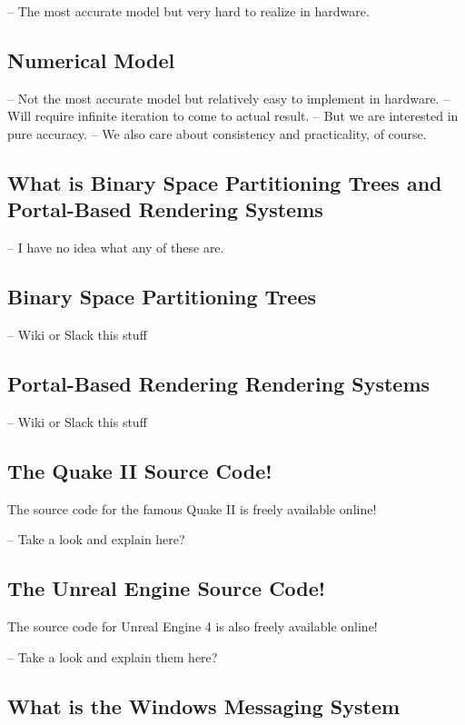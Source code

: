 \documentclass[a4paper,12pt]{book}
\begin{document}
-- The most accurate model but very hard to realize in hardware.

\subsection{Numerical Model}

-- Not the most accurate model but relatively easy to implement in hardware.
-- Will require infinite iteration to come to actual result.
-- But we are interested in pure accuracy.
-- We also care about consistency and practicality, of course.

\subsection{What is Binary Space Partitioning Trees and Portal-Based Rendering Systems}

-- I have no idea what any of these are.


\subsection{Binary Space Partitioning Trees}

-- Wiki or Slack this stuff

\subsection{Portal-Based Rendering Rendering Systems}

-- Wiki or Slack this stuff

\subsection{The Quake II Source Code!}

The source code for the famous Quake II is freely available online!

-- Take a look and explain here?

\subsection{The Unreal Engine Source Code!}

The source code for Unreal Engine 4 is also freely available online!

-- Take a look and explain them here?

\subsection{What is the Windows Messaging System}
\end{document}

